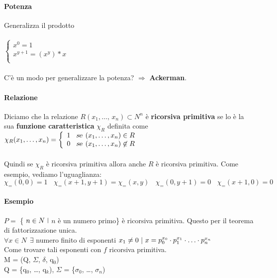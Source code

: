 \documentclass[10pt]{book}
\begin{document}
\begin{multicols}{2}
\paragraph{Potenza}
Generalizza il prodotto\\\\
\begin{math}
		\left\{
		\begin{array}{l}
			x^0 = 1\\
			x^{y + 1} = (x^y) * x\\
		\end{array}
		\right.
\end{math}\\\\
C'è un modo per generalizzare la potenza? $\Rightarrow$ \textbf{Ackerman}.
\end{multicols}

\paragraph{Relazione} Diciamo che la relazione $R(x_1,\ldots,\,x_n) \subset N^n$ è \textbf{ricorsiva primitiva} se lo è la sua \textbf{funzione caratteristica} $\chi_R$ definita come\\
\begin{math}
\chi_R(x_1,\ldots, x_n) = 
		\left\{
		\begin{array}{l}
			1 \:\:\:\:\textsl{se}\:\: (x_1, \ldots, x_n) \in R\\
			0 \:\:\:\:\textsl{se}\:\: (x_1, \ldots, x_n) \not\in R
		\end{array}
		\right.
\end{math}\\\\
Quindi se $\chi_R$ è ricorsiva primitiva allora anche $R$ è ricorsiva primitiva. Come esempio, vediamo l'uguaglianza:
$$\chi_=(0, 0) = 1\:\:\:\:\chi_=(x+1, y+1)=\chi_=(x,y)\:\:\:\:\chi_=(0, y+1)=0\:\:\:\:\chi_=(x+1,0)=0$$

\paragraph{Esempio} $P =$ \{ $n \in N\:\:\vline$ $n$ è un numero primo\} è ricorsiva primitiva. Questo per il teorema di fattorizzazione unica.\\
$\forall x \in N\:\:\exists$ numero finito di esponenti $x_1 \neq 0\:\:\vline\:\: x = p_0^{x_0}\cdot p_1^{x_1}\cdot\ldots\cdot p_n^{x_n}$\\
Come trovare tali esponenti con $f$ ricorsiva primitiva.\\
M = (Q, $\Sigma$, $\delta$, q$_0$)\\
Q = \{q$_0$, \ldots, q$_k$), $\Sigma$ = \{$\sigma_0$, \ldots, $\sigma_n$)
\pagebreak
\end{document}
